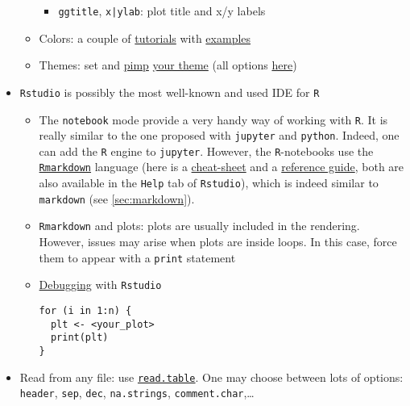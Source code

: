 \documentclass[a4paper,12pt,%
              final%
              ]{article}
\begin{document}
\begin{itemize}
\begin{itemize}
\begin{itemize}
          \item \verb|ggtitle|, \verb!x|ylab!: plot title and x/y labels
        \end{itemize}
      \item Colors: a couple of \href{http://www.sthda.com/english/wiki/ggplot2-colors-how-to-change-colors-automatically-and-manually#change-colors-by-groups}{tutorials} with \href{https://www.datanovia.com/en/blog/ggplot-colors-best-tricks-you-will-love/}{examples}
      \item Themes: set and \href{https://bookdown.org/rdpeng/RProgDA/building-a-new-theme.html}{pimp} \href{https://ggplot2.tidyverse.org/reference/theme_get.html}{your theme} (all options \href{https://ggplot2.tidyverse.org/reference/theme.html}{here})
    \end{itemize}
  \item \texttt{Rstudio} is possibly the most well-known and used IDE for \texttt{R}
    \begin{itemize}
      \item The \texttt{notebook} mode provide a very handy way of working with \texttt{R}. It is really similar to the one proposed with \texttt{jupyter} and \texttt{python}. Indeed, one can add the \texttt{R} engine to \texttt{jupyter}. However, the \texttt{R}-notebooks use the \href{https://rmarkdown.rstudio.com/index.html}{\texttt{Rmarkdown}} language (here is a \href{https://raw.githubusercontent.com/rstudio/cheatsheets/master/rmarkdown-2.0.pdf}{cheat-sheet} and a \href{https://www.rstudio.com/wp-content/uploads/2015/03/rmarkdown-reference.pdf}{reference guide}, both are also available in the \texttt{Help} tab of \texttt{Rstudio}), which is indeed similar to \texttt{markdown} (see \autoref{sec:markdown}).
      \item \texttt{Rmarkdown} and plots: plots are usually included in the rendering. However, issues may arise when plots are inside loops. In this case, force them to appear with a \verb|print| statement
      \item \href{https://support.rstudio.com/hc/en-us/articles/200713843?version=1.4.1717&mode=desktop}{Debugging} with \texttt{Rstudio}
\begin{verbatim}
for (i in 1:n) {
  plt <- <your_plot>
  print(plt)
}
\end{verbatim}
    \end{itemize}
  \item Read from any file: use \href{https://stat.ethz.ch/R-manual/R-devel/library/utils/html/read.table.html}{\texttt{read.table}}. One may choose between lots of options: \texttt{header}, \texttt{sep}, \texttt{dec}, \texttt{na.strings}, \texttt{comment.char},\ldots

\end{itemize}
\end{document}
